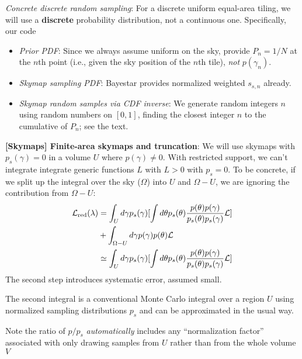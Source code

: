 \emph{Concrete discrete random sampling}: For a discrete uniform equal-area tiling, we will use a
\textbf{discrete} probability distribution, not a continuous one.   Specifically, our code 
\begin{itemize}
\item \emph{Prior PDF}: Since we always assume uniform on the sky,  provide $P_n=1/N$ at the $n$th
point (i.e., given the sky position of the $n$th tile), \emph{not} $p(\gamma_n)$.

\item \emph{Skymap sampling PDF}: Bayestar provides normalized weighted $s_{s,n}$ already.  

\item \emph{Skymap random samples via CDF inverse}: We generate random integers $n$ using random numbers on $[0,1]$, finding the
  closest integer $n$ to the  cumulative of $P_n$; see the text.
\end{itemize}




\noindent \textbf{[Skymaps] Finite-area skymaps and truncation}: We will use skymaps with
$p_s(\gamma)=0$  in a volume $U$ where $p(\gamma)\ne 0$.  With restricted support, we can't integrate
integrate generic functions $L$ with $L>0$ with $p_s=0$.  To be concrete, if we split up the integral over the sky ($\Omega$) into $U$ and
$\Omega-U$, we are ignoring the contribution from $\Omega-U$:
\begin{align}
{\cal L}_{\rm red}(\lambda) &= \int_U d\gamma p_s(\gamma) 
 [\int d\theta p_s(\theta)
  \frac{p(\theta)p(\gamma)}{p_s(\theta)p_s(\gamma)}{\cal L}] 
  \nonumber \\ &
 + \int_{\Omega-U}d\gamma p(\gamma) p(\theta){\cal L} 
\nonumber \\ &
\simeq \int_U d\gamma p_s(\gamma) [\int d\theta p_s(\theta)
  \frac{p(\theta)p(\gamma)}{p_s(\theta)p_s(\gamma)}{\cal L}] 
\end{align}
The second step introduces systematic error, assumed small.

The second integral is a conventional Monte Carlo integral over a region $U$ using normalized sampling distributions $p_s$ and
can be approximated in the usual way.

Note the ratio of $p/p_s$ \emph{automatically} includes any ``normalization factor'' associated with only drawing
samples from $U$ rather than from the whole volume $V$

